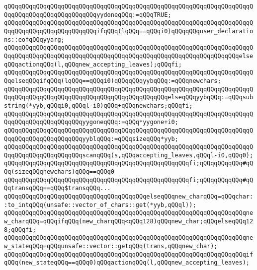 \verb|qQQqqQQqqQQqqQQqqQQqqQQqqQQqqQQqqQQqqQQqqQQqqQQqqQQqqQQqqQQqqQQqqQQqqQQqqQQqqQQqqQQqqQQqqQQqqQQqyydoneqQQq:=qQQqTRUE;|\newline
\verb|qQQqqQQqqQQqqQQqqQQqqQQqqQQqqQQqqQQqqQQqqQQqqQQqqQQqqQQqqQQqqQQqqQQqqQQqqQQqqQQqqQQqqQQqqQQqqQQqifqQQq(lqQQq==qQQqi0)qQQqqQQquser_declarations::eofqQQqyyarg;|\newline
\verb|qQQqqQQqqQQqqQQqqQQqqQQqqQQqqQQqqQQqqQQqqQQqqQQqqQQqqQQqqQQqqQQqqQQqqQQqqQQqqQQqqQQqqQQqqQQqqQQqqQQqqQQqqQQqqQQqqQQqqQQqqQQqqQQqqQQqqQQqelseqQQqactionqQQq(l,qQQqnew_accepting_leaves);qQQqfi;|\newline
\verb|qQQqqQQqqQQqqQQqqQQqqQQqqQQqqQQqqQQqqQQqqQQqqQQqqQQqqQQqqQQqqQQqqQQqqQQqelseqQQqifqQQq(lqQQq==qQQqi0)qQQqqQQqyybqQQq:=qQQqnewchars;|\newline
\verb|qQQqqQQqqQQqqQQqqQQqqQQqqQQqqQQqqQQqqQQqqQQqqQQqqQQqqQQqqQQqqQQqqQQqqQQqqQQqqQQqqQQqqQQqqQQqqQQqqQQqqQQqqQQqqQQqqQQqelseqQQqyybqQQq:=qQQqsubstring(*yyb,qQQqi0,qQQql-i0)qQQq+qQQqnewchars;qQQqfi;|\newline
\verb|qQQqqQQqqQQqqQQqqQQqqQQqqQQqqQQqqQQqqQQqqQQqqQQqqQQqqQQqqQQqqQQqqQQqqQQqqQQqqQQqqQQqqQQqqQQqyygoneqQQq:=qQQq*yygone+i0;|\newline
\verb|qQQqqQQqqQQqqQQqqQQqqQQqqQQqqQQqqQQqqQQqqQQqqQQqqQQqqQQqqQQqqQQqqQQqqQQqqQQqqQQqqQQqqQQqqQQqyyblqQQq:=qQQqsizeqQQq*yyb;|\newline
\verb|qQQqqQQqqQQqqQQqqQQqqQQqqQQqqQQqqQQqqQQqqQQqqQQqqQQqqQQqqQQqqQQqqQQqqQQqqQQqqQQqqQQqqQQqqQQqscanqQQq(s,qQQqaccepting_leaves,qQQql-i0,qQQq0);|\newline
\verb|qQQqqQQqqQQqqQQqqQQqqQQqqQQqqQQqqQQqqQQqqQQqqQQqqQQqfi;qQQqqQQqqQQq#qQQq(sizeqQQqnewchars)qQQq==qQQq0|\newline
\verb|qQQqqQQqqQQqqQQqqQQqqQQqqQQqqQQqqQQqqQQqqQQqqQQqqQQqfi;qQQqqQQqqQQq#qQQqtransqQQq==qQQq$transqQQq...|\newline
\verb|qQQqqQQqqQQqqQQqqQQqqQQqqQQqqQQqqQQqqQQqelseqQQqnew_charqQQq=qQQqchar::to_intqQQq(unsafe::vector_of_chars::get(*yyb,qQQql));|\newline
\verb|qQQqqQQqqQQqqQQqqQQqqQQqqQQqqQQqqQQqqQQqqQQqqQQqqQQqqQQqqQQqqQQqqQQqnew_charqQQq=qQQqifqQQq(new_charqQQq<qQQq128)qQQqnew_char;qQQqelseqQQq128;qQQqfi;|\newline
\verb|qQQqqQQqqQQqqQQqqQQqqQQqqQQqqQQqqQQqqQQqqQQqqQQqqQQqqQQqqQQqqQQqqQQqnew_stateqQQq=qQQqunsafe::vector::getqQQq(trans,qQQqnew_char);|\newline
\verb|qQQqqQQqqQQqqQQqqQQqqQQqqQQqqQQqqQQqqQQqqQQqqQQqqQQqqQQqqQQqqQQqqQQqifqQQq(new_stateqQQq==qQQq0)qQQqactionqQQq(l,qQQqnew_accepting_leaves);|\newline
